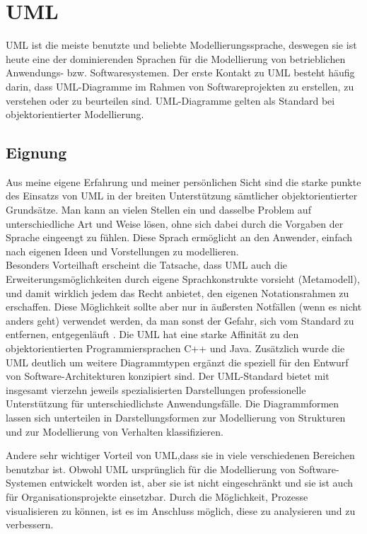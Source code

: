 \section{UML}
\label{sc:UMLB}
UML ist die meiste benutzte und beliebte Modellierungssprache, deswegen sie ist heute eine der dominierenden Sprachen für die Modellierung von betrieblichen Anwendungs- bzw. Softwaresystemen. Der erste Kontakt zu UML besteht häufig darin, dass UML-Diagramme im Rahmen von Softwareprojekten zu erstellen, zu verstehen oder zu beurteilen sind. UML-Diagramme gelten als Standard bei objektorientierter Modellierung\cite{MT005}.
\subsection{Eignung}

Aus meine eigene Erfahrung und meiner persönlichen Sicht sind die starke punkte des Einsatzs von UML in der breiten Unterstützung sämtlicher objektorientierter Grundsätze. 
Man kann an vielen Stellen ein und dasselbe Problem auf unterschiedliche Art und Weise lösen, ohne sich dabei durch die Vorgaben der Sprache eingeengt zu fühlen. Diese Sprach ermöglicht an den Anwender, einfach nach eigenen Ideen und Vorstellungen zu modellieren.\\
Besonders Vorteilhaft erscheint die Tatsache, dass UML auch die Erweiterungsmöglichkeiten durch eigene Sprachkonstrukte vorsieht (Metamodell), und damit wirklich jedem das Recht anbietet, den eigenen Notationsrahmen zu erschaffen. Diese Möglichkeit sollte aber nur in äußersten Notfällen (wenn es nicht anders geht) verwendet werden, da man sonst der Gefahr, sich vom Standard zu entfernen, entgegenläuft \cite{MT015}.
Die UML hat eine starke Affinität zu den objektorientierten Programmiersprachen C++  und Java. Zusätzlich wurde die UML deutlich um weitere Diagrammtypen ergänzt die speziell für den Entwurf von Software-Architekturen konzipiert sind.
Der UML-Standard bietet mit insgesamt vierzehn jeweils spezialisierten Darstellungen professionelle Unterstützung für unterschiedlichste Anwendungsfälle. Die Diagrammformen lassen sich unterteilen in Darstellungsformen zur Modellierung von Strukturen und zur Modellierung von Verhalten klassifizieren.

Andere sehr wichtiger Vorteil von UML,dass sie in viele verschiedenen Bereichen benutzbar ist. Obwohl UML ursprünglich für die Modellierung von Software-Systemen entwickelt worden ist, aber sie ist nicht eingeschränkt und sie ist auch für Organisationsprojekte einsetzbar. Durch die Möglichkeit, Prozesse visualisieren zu können, ist es im Anschluss möglich, diese zu analysieren und zu verbessern.

